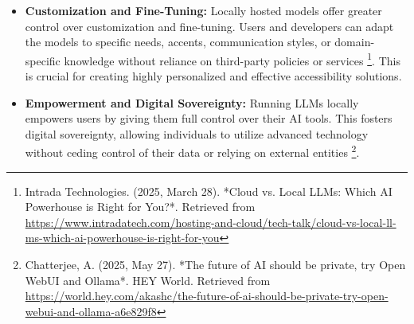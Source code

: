 \begin{itemize}
    \item \textbf{Customization and Fine-Tuning:} Locally hosted models offer greater control over customization and fine-tuning. Users and developers can adapt the models to specific needs, accents, communication styles, or domain-specific knowledge without reliance on third-party policies or services \footnote{Intrada Technologies. (2025, March 28). *Cloud vs. Local LLMs: Which AI Powerhouse is Right for You?*. Retrieved from \url{https://www.intradatech.com/hosting-and-cloud/tech-talk/cloud-vs-local-ll-ms-which-ai-powerhouse-is-right-for-you}}. This is crucial for creating highly personalized and effective accessibility solutions.

    \item \textbf{Empowerment and Digital Sovereignty:} Running LLMs locally empowers users by giving them full control over their AI tools. This fosters digital sovereignty, allowing individuals to utilize advanced technology without ceding control of their data or relying on external entities \footnote{Chatterjee, A. (2025, May 27). *The future of AI should be private, try Open WebUI and Ollama*. HEY World. Retrieved from \url{https://world.hey.com/akashc/the-future-of-ai-should-be-private-try-open-webui-and-ollama-a6e829f8}}.

\end{itemize}

